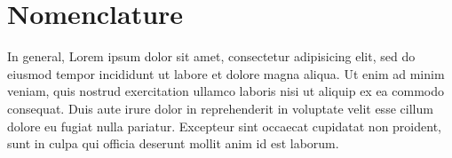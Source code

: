 \documentclass[10pt,a4paper,extrafontsizes,oldfontcommands,oneside]{memoir}
\begin{document}
\clearpage

\begin{hideshorttoc}

\printshorttoc

\end{hideshorttoc}


\clearpage
\printmaintoc


\clearpage

\listoffigures
\clearpage
\listoftables
\clearpage



\chapter*{Nomenclature}

In general, Lorem ipsum dolor sit amet, consectetur adipisicing elit, sed do eiusmod tempor incididunt ut labore et dolore magna aliqua. Ut enim ad minim veniam, quis nostrud exercitation ullamco laboris nisi ut aliquip ex ea commodo consequat. Duis aute irure dolor in reprehenderit in voluptate velit esse cillum dolore eu fugiat nulla pariatur. Excepteur sint occaecat cupidatat non proident, sunt in culpa qui officia deserunt mollit anim id est laborum.


\printglossary[title=List of Notations, toctitle=List of Notations]

\printglossary[type=\acronymtype,title=List of Acronyms, toctitle=List of Acronyms]
\end{document}
